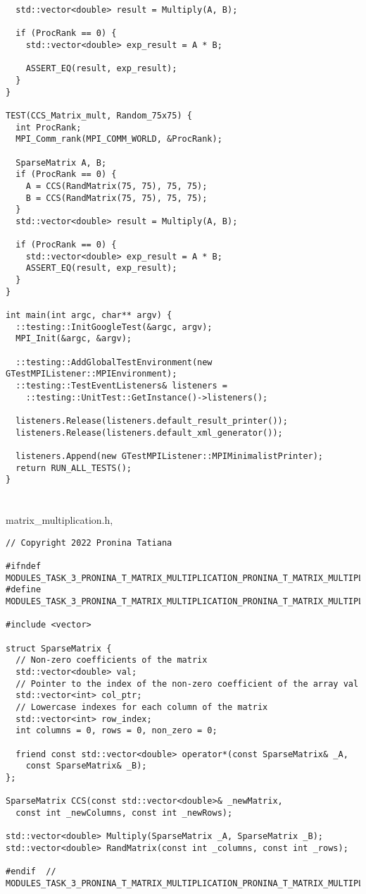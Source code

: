 \documentclass[12pt,a4paper]{article}
\begin{document}
\begin{lstlisting}
  std::vector<double> result = Multiply(A, B);

  if (ProcRank == 0) {
    std::vector<double> exp_result = A * B;

    ASSERT_EQ(result, exp_result);
  }
}

TEST(CCS_Matrix_mult, Random_75x75) {
  int ProcRank;
  MPI_Comm_rank(MPI_COMM_WORLD, &ProcRank);

  SparseMatrix A, B;
  if (ProcRank == 0) {
    A = CCS(RandMatrix(75, 75), 75, 75);
    B = CCS(RandMatrix(75, 75), 75, 75);
  }
  std::vector<double> result = Multiply(A, B);

  if (ProcRank == 0) {
    std::vector<double> exp_result = A * B;
    ASSERT_EQ(result, exp_result);
  }
}

int main(int argc, char** argv) {
  ::testing::InitGoogleTest(&argc, argv);
  MPI_Init(&argc, &argv);

  ::testing::AddGlobalTestEnvironment(new GTestMPIListener::MPIEnvironment);
  ::testing::TestEventListeners& listeners =
    ::testing::UnitTest::GetInstance()->listeners();

  listeners.Release(listeners.default_result_printer());
  listeners.Release(listeners.default_xml_generator());

  listeners.Append(new GTestMPIListener::MPIMinimalistPrinter);
  return RUN_ALL_TESTS();
}
\end{lstlisting}
\section{} matrix\_multiplication.h,
\begin{lstlisting}
// Copyright 2022 Pronina Tatiana

#ifndef MODULES_TASK_3_PRONINA_T_MATRIX_MULTIPLICATION_PRONINA_T_MATRIX_MULTIPLICATION_H_
#define MODULES_TASK_3_PRONINA_T_MATRIX_MULTIPLICATION_PRONINA_T_MATRIX_MULTIPLICATION_H_

#include <vector>

struct SparseMatrix {
  // Non-zero coefficients of the matrix
  std::vector<double> val;
  // Pointer to the index of the non-zero coefficient of the array val
  std::vector<int> col_ptr;
  // Lowercase indexes for each column of the matrix
  std::vector<int> row_index;
  int columns = 0, rows = 0, non_zero = 0;

  friend const std::vector<double> operator*(const SparseMatrix& _A,
    const SparseMatrix& _B);
};

SparseMatrix CCS(const std::vector<double>& _newMatrix,
  const int _newColumns, const int _newRows);

std::vector<double> Multiply(SparseMatrix _A, SparseMatrix _B);
std::vector<double> RandMatrix(const int _columns, const int _rows);

#endif  // MODULES_TASK_3_PRONINA_T_MATRIX_MULTIPLICATION_PRONINA_T_MATRIX_MULTIPLICATION_H_
\end{lstlisting}
\end{document}
